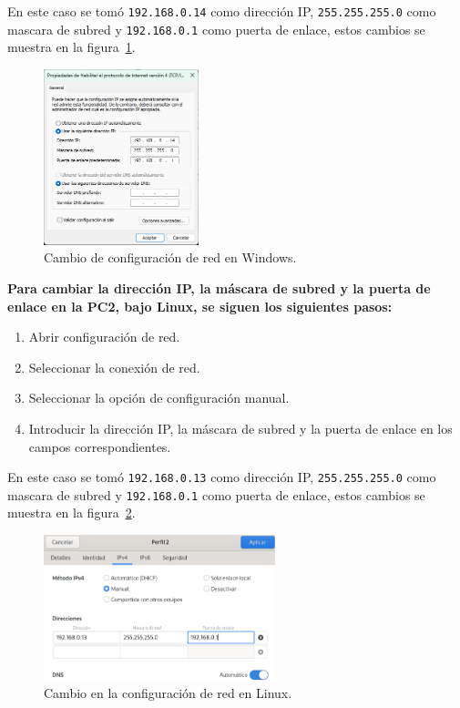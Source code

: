         En este caso se tomó \texttt{192.168.0.14} como dirección IP, \texttt{255.255.255.0} como mascara de subred y \texttt{192.168.0.1} como puerta de enlace, estos cambios se muestra en la figura~\ref{fig:cambiar_configuracion_red_windows}.

        \begin{figure}[H]
            \centering
            \includegraphics[width=0.4\textwidth]{img/cambiar_IP_Windows.png}
            \caption{Cambio de configuración de red en Windows.}
            \label{fig:cambiar_configuracion_red_windows}
        \end{figure}

        \textbf{Para cambiar la dirección IP, la máscara de subred y la puerta de enlace en la PC2, bajo Linux, se siguen los siguientes pasos:}

        \begin{enumerate}
            \item Abrir configuración de red.
            \item Seleccionar la conexión de red.
            \item Seleccionar la opción de configuración manual.
            \item Introducir la dirección IP, la máscara de subred y la puerta de enlace en los campos correspondientes.
        \end{enumerate}

        En este caso se tomó \texttt{192.168.0.13} como dirección IP, \texttt{255.255.255.0} como mascara de subred y \texttt{192.168.0.1} como puerta de enlace, estos cambios se muestra en la figura~\ref{fig:cambiar_configuracion_red_linux}.

        \begin{figure}[H]
            \centering
            \includegraphics[width=0.6\textwidth]{img/cambiar_IP_Linux.png}
            \caption{Cambio en la configuración de red en Linux.}
            \label{fig:cambiar_configuracion_red_linux}
        \end{figure}

